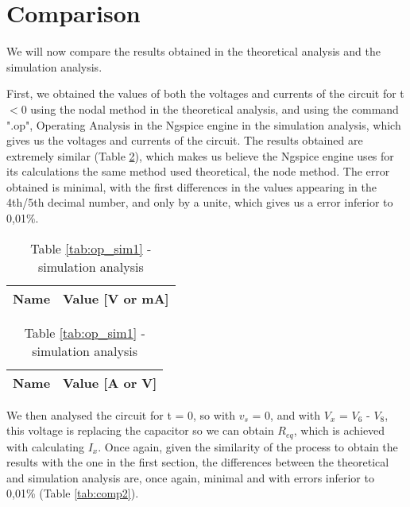 \newpage
\section{Comparison}
\label{sec:comparison}
\par
We will now compare the results obtained in the theoretical analysis and the simulation analysis.\par
\par

First, we obtained the values of both the voltages and currents of the circuit for t$<$0 using the nodal method in the theoretical analysis, and using the command ".op", Operating Analysis in the Ngspice engine in the simulation analysis, which gives us the voltages and currents of the circuit. The results obtained are extremely similar (Table \ref{tab:comp1}), which makes us believe the Ngspice engine uses for its calculations the same method used theoretical, the node method. The error obtained is minimal, with the first differences in the values appearing in the 4th/5th decimal number, and only by a unite, which gives us a error inferior to 0,01\%.

\begin{table}[H]
    \caption{Operating Point for $t<0$ comparison}
    \begin{subtable}{.5\linewidth}
    \centering
      \caption{Table \ref{tab:nodal1} - theoretical analysis}
      \begin{tabular}{|l|r|}
       \hline    
       {\bf Name} & {\bf Value [V or mA]} \\ \hline
       
      \end{tabular}
      \label{tab:nodal1comp}
    \end{subtable}%
    \begin{subtable}{.5\linewidth}
    \centering
      \caption{Table \ref{tab:op_sim1} - simulation analysis}
      \begin{tabular}{|l|r|}
       \hline    
      {\bf Name} & {\bf Value [A or V]} \\ \hline
      
      \end{tabular}
      \label{tab:op_sim1comp}
    \end{subtable} 
    \label{tab:comp1}
\end{table}


We then analysed the circuit for t = 0, so with $v_s$ = 0, and with $V_x$ = $V_6$ - $V_8$, this voltage is replacing the capacitor so we can obtain $R_{eq}$, which is achieved with calculating $I_x$. Once again, given the similarity of the process to obtain the results with the one in the first section, the differences between the theoretical and simulation analysis are, once again, minimal and with errors inferior to 0,01\% (Table \ref{tab:comp2}).

